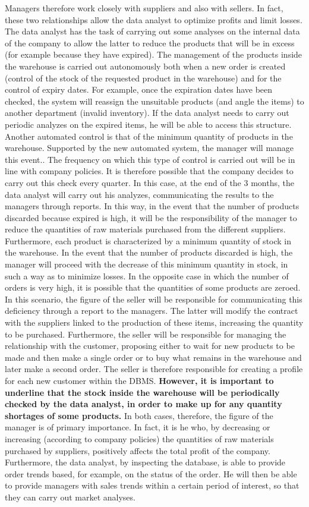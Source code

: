 Managers therefore work closely with suppliers and also with sellers. In fact, these two relationships allow the data analyst to optimize profits and limit losses. The data analyst has the task of carrying out some analyses on the internal data of the company to allow the latter to reduce the products that will be in excess (for example because they have expired). The management of the products inside the warehouse is carried out autonomously both when a new order is created (control of the stock of the requested product in the warehouse) and for the control of expiry dates. For example, once the expiration dates have been checked, the system will reassign the unsuitable products (and angle the items) to another department (invalid inventory). If the data analyst needs to carry out periodic analyzes on the expired items, he will be able to access this structure. Another automated control is that of the minimum quantity of products in the warehouse. Supported by the new automated system, the manager will manage this event.. The frequency on which this type of control is carried out will be in line with company policies. It is therefore possible that the company decides to carry out this check every quarter. In this case, at the end of the 3 months, the data analyst will carry out his analyzes, communicating the results to the managers through reports. In this way, in the event that the number of products discarded because expired is high, it will be the responsibility of the manager to reduce the quantities of raw materials purchased from the different suppliers. Furthermore, each product is characterized by a minimum quantity of stock in the warehouse. In the event that the number of products discarded is high, the manager will proceed with the decrease of this minimum quantity in stock, in such a way as to minimize losses. In the opposite case in which the number of orders is very high, it is possible that the quantities of some products are zeroed. In this scenario, the figure of the seller will be responsible for communicating this deficiency through a report to the managers. The latter will modify the contract with the suppliers linked to the production of these items, increasing the quantity to be purchased. Furthermore, the seller will be responsible for managing the relationship with the customer, proposing either to wait for new products to be made and then make a single order or to buy what remains in the warehouse and later make a second order. The seller is therefore responsible for creating a profile for each new customer within the DBMS.  \textbf{However, it is important to underline that the stock inside the warehouse will be periodically checked by the data analyst, in order to make up for any quantity shortages of some products.} In both cases, therefore, the figure of the manager is of primary importance. In fact, it is he who, by decreasing or increasing (according to company policies) the quantities of raw materials purchased by suppliers, positively affects the total profit of the company. Furthermore, the data analyst, by inspecting the database, is able to provide order trends based, for example, on the status of the order. He will then be able to provide managers with sales trends within a certain period of interest, so that they can carry out market analyses.

